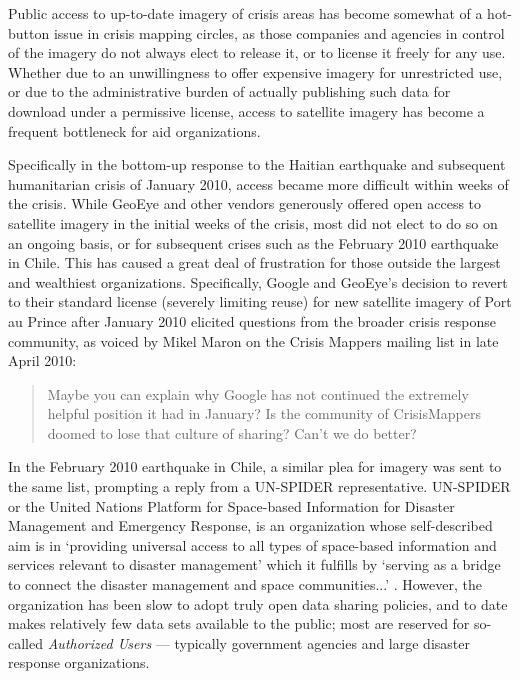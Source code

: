 \documentclass[11pt,oneside,notitlepage]{report}
\begin{document}
{{Public access to up-to-date imagery of crisis areas has become somewhat of a hot-button issue in crisis mapping circles, as those companies and agencies in control of the imagery do not always elect to release it, or to license it freely for any use. Whether due to an unwillingness to offer expensive imagery for unrestricted use, or due to the administrative burden of actually publishing such data for download under a permissive license, access to satellite imagery has become a frequent bottleneck for aid organizations. 

Specifically in the bottom-up response to the Haitian earthquake and subsequent humanitarian crisis of January 2010, access became more difficult within weeks of the crisis. While GeoEye and other vendors generously offered open access to satellite imagery in the initial weeks of the crisis, most did not elect to do so on an ongoing basis, or for subsequent crises such as the February 2010 earthquake in Chile. This has caused a great deal of frustration for those outside the largest and wealthiest organizations. Specifically, Google and GeoEye's decision to revert to their standard license (severely limiting reuse) for new satellite imagery of Port au Prince after January 2010 elicited questions from the broader crisis response community, as voiced by Mikel Maron on the Crisis Mappers mailing list in late April 2010:

\begin{quote}
Maybe you can explain why Google has not continued the extremely helpful position it had in January?
Is the community of CrisisMappers doomed to lose that culture of sharing? Can't we do better?
\end{quote}

In the February 2010 earthquake in Chile, a similar plea for imagery was sent to the same list, prompting a reply from a UN-SPIDER representative. UN-SPIDER or the United Nations Platform for Space-based Information for Disaster Management and Emergency Response, is an organization whose self-described aim is in `providing universal access to all types of space-based information and services relevant to disaster management' which it fulfills by `serving as a bridge to connect the disaster management and space communities...' \cite{unspider2010aims}. However, the organization has been slow to adopt truly open data sharing policies, and to date makes relatively few data sets available to the public; most are reserved for so-called \emph{Authorized Users} --- typically government agencies and large disaster response organizations. \cite{charter2010brochure}  

}}
\end{document}
